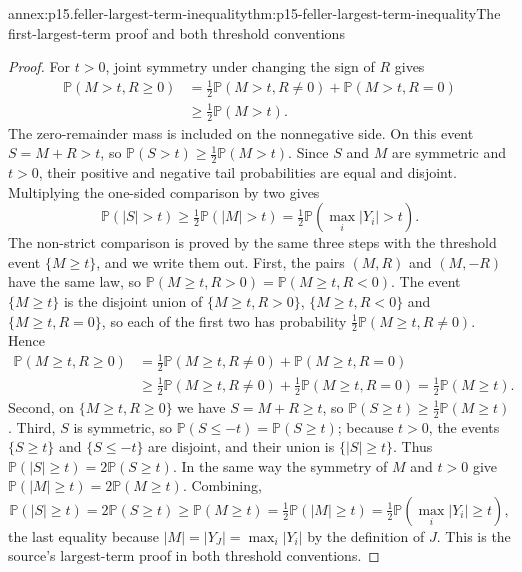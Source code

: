 \begin{annexitem}{annex:p15.feller-largest-term-inequality}{thm:p15-feller-largest-term-inequality}{The first-largest-term proof and both threshold conventions}
\begin{proof}
For \(t>0\), joint symmetry under changing the sign of \(R\)
gives
\[
 \begin{aligned}
 \mathbb P(M>t,R\geq0)
 &=\tfrac12\mathbb P(M>t,R\ne0)+\mathbb P(M>t,R=0)\\
 &\geq\tfrac12\mathbb P(M>t).
 \end{aligned}
\]
The zero-remainder mass is included on the nonnegative side.
On this event \(S=M+R>t\), so
\(\mathbb P(S>t)\geq\frac12\mathbb P(M>t)\).
Since \(S\) and \(M\) are symmetric and \(t>0\), their positive
and negative tail probabilities are equal and disjoint. Multiplying
the one-sided comparison by two gives
\[
 \mathbb P(|S|>t)\geq\tfrac12\mathbb P(|M|>t)
                    =\tfrac12\mathbb P(\max_i|Y_i|>t).
\]
The non-strict comparison is proved by the same three steps with
the threshold event \(\{M\geq t\}\), and we write them out.
First, the pairs \((M,R)\) and \((M,-R)\) have the same law, so
\(\mathbb P(M\geq t,R>0)=\mathbb P(M\geq t,R<0)\). The event
\(\{M\geq t\}\) is the disjoint union of
\(\{M\geq t,R>0\}\), \(\{M\geq t,R<0\}\) and
\(\{M\geq t,R=0\}\), so each of the first two has probability
\(\frac12\mathbb P(M\geq t,R\ne0)\). Hence
\[
 \begin{aligned}
 \mathbb P(M\geq t,R\geq0)
 &=\tfrac12\mathbb P(M\geq t,R\ne0)+\mathbb P(M\geq t,R=0)\\
 &\geq\tfrac12\mathbb P(M\geq t,R\ne0)
      +\tfrac12\mathbb P(M\geq t,R=0)
  =\tfrac12\mathbb P(M\geq t).
 \end{aligned}
\]
Second, on \(\{M\geq t,R\geq0\}\) we have \(S=M+R\geq t\), so
\(\mathbb P(S\geq t)\geq\frac12\mathbb P(M\geq t)\).
Third, \(S\) is symmetric, so \(\mathbb P(S\leq-t)=\mathbb P(S\geq t)\);
because \(t>0\), the events \(\{S\geq t\}\) and \(\{S\leq-t\}\)
are disjoint, and their union is \(\{|S|\geq t\}\). Thus
\(\mathbb P(|S|\geq t)=2\mathbb P(S\geq t)\). In the same way the
symmetry of \(M\) and \(t>0\) give
\(\mathbb P(|M|\geq t)=2\mathbb P(M\geq t)\). Combining,
\[
 \mathbb P(|S|\geq t)=2\mathbb P(S\geq t)\geq\mathbb P(M\geq t)
   =\tfrac12\mathbb P(|M|\geq t)
   =\tfrac12\mathbb P(\max_i|Y_i|\geq t),
\]
the last equality because \(|M|=|Y_J|=\max_i|Y_i|\) by the
definition of \(J\). This is the source's largest-term proof in both
threshold conventions.


\end{proof}
\end{annexitem}
